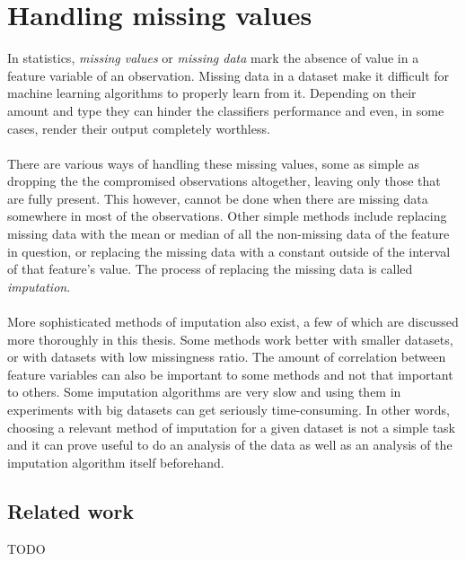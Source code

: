 \documentclass[11pt]{article}
\begin{document}
  \section{Handling missing values}
    In statistics, {\it missing values} or {\it missing data} mark the absence of value in a feature variable of an observation. Missing data in a dataset make it difficult for machine learning algorithms to properly learn from it. Depending on their amount and type they can hinder the classifiers performance and even, in some cases, render their output completely worthless.
    \\~\\
    There are various ways of handling these missing values, some as simple as dropping the the compromised observations altogether, leaving only those that are fully present. This however, cannot be done when there are missing data somewhere in most of the observations. Other simple methods include replacing missing data with the mean or median of all the non-missing data of the feature in question, or replacing the missing data with a constant outside of the interval of that feature's value. The process of replacing the missing data is called {\it imputation}.
    \\~\\
    More sophisticated methods of imputation also exist, a few of which are discussed more thoroughly in this thesis. Some methods work better with smaller datasets, or with datasets with low missingness ratio. The amount of correlation between feature variables can also be important to some methods and not that important to others. Some imputation algorithms are very slow and using them in experiments with big datasets can get seriously time-consuming. In other words, choosing a relevant method of imputation for a given dataset is not a simple task and it can prove useful to do an analysis of the data as well as an analysis of the imputation algorithm itself beforehand.
    \subsection{Related work}
      {\color{red}TODO}
\end{document}

